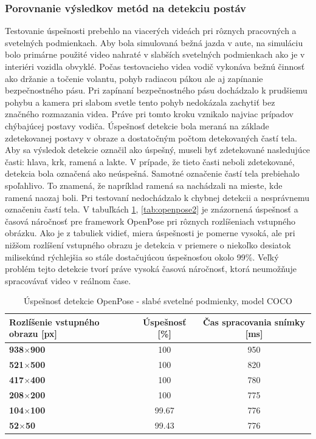 \documentclass[slovak,master,dept460,male,cpp,cpdeclaration]{diploma}
\begin{document}
\subsubsection*{Porovnanie výsledkov metód na detekciu postáv}
\label{sec:compare}
Testovanie úspešnosti  prebehlo na viacerých videách pri rôznych  pracovných a svetelných  podmienkach. Aby bola simulovaná bežná  jazda v aute, na simuláciu bolo primárne použité video nahraté v slabších  svetelných podmienkach ako je v interiéri vozidla obvyklé. Počas testovacieho videa  vodič vykonáva bežnú činnosť ako držanie a točenie volantu, pohyb radiacou pákou ale aj zapínanie  bezpečnostného pásu. Pri zapínaní bezpečnostného pásu dochádzalo k prudšiemu pohybu a  kamera pri slabom svetle tento pohyb nedokázala  zachytiť bez  značného rozmazania videa. Práve pri tomto  kroku vznikalo najviac  prípadov chýbajúcej postavy vodiča. Úspešnosť detekcie bola meraná na základe zdetekovanej postavy v obraze a dostatočným počtom detekovaných častí tela. Aby sa výsledok detekcie označil ako úspešný, museli byť zdetekované nasledujúce časti: hlava, krk, ramená a lakte. V prípade, že tieto časti neboli zdetekované,  detekcia bola označená ako  neúspešná. Samotné označenie  častí tela prebiehalo spoľahlivo. To znamená, že napríklad ramená sa nachádzali na mieste, kde ramená naozaj boli. Pri testovaní nedochádzalo k chybnej  detekcii a nesprávnemu označeniu častí tela. V  tabuľkách \ref{tab:openpose1}, \ref{tab:openpose2} je znázornená úspešnosť a časová náročnosť pre framework OpenPose pri rôznych rozlíšeniach vstupného obrázku. Ako je z tabuliek vidieť, miera úspešnosti je pomerne vysoká, ale pri nižšom rozlíšení vstupného obrazu je detekcia v priemere o niekoľko desiatok milisekúnd  rýchlejšia  so stále dostačujúcou úspešnosťou okolo 99\%. Veľký problém tejto detekcie tvorí práve vysoká časová náročnosť, ktorá  neumožňuje spracovávať video v reálnom čase.

\begin{table}[H]
\begin{tabular}{|l|c|c|}
\hline
\textbf{Rozlíšenie vstupného obrazu [px]}        & \textbf{Úspešnosť [\%]}  & \textbf{Čas spracovania snímky [ms]} \\ \hline
\textbf{938$\times$900}      &   100           &   950        \\ \hline
\textbf{521$\times$500}      &   100           &   820        \\ \hline
\textbf{417$\times$400}      &   100           &   780        \\ \hline
\textbf{208$\times$200}      &   100           &   775        \\ \hline
\textbf{104$\times$100}      &   99.67         &   776        \\ \hline
\textbf{52$\times$50}       &   99.43          &   776        \\ \hline
\end{tabular}
	\caption{Úspešnosť detekcie OpenPose - slabé svetelné podmienky,  model COCO}
	\label{tab:openpose1}
\end{table}
\end{document}
